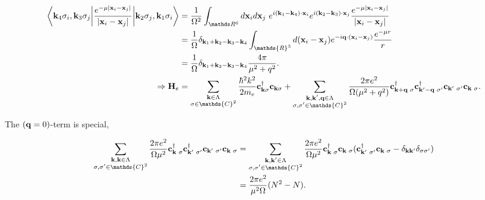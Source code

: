 \documentclass{homework}
\begin{document}
\begin{equation}
    \begin{split}
        \bigg\langle {{\bf k}_4 \sigma_i, {\bf k}_3 \sigma_j}\bigg| \frac{e^{-\mu |{\bf x}_i - {\bf x}_j|}}{|{\bf x}_i- {\bf x}_j|} \bigg|{{\bf k}_2 \sigma_j, {\bf k}_1 \sigma_i} \bigg\rangle &= \frac{1}{\Omega^2} \int_{\R^6} d{\bf x}_i d{\bf x}_j \blanky e^{i({\bf k}_1 - {\bf k}_4) \cdot {\bf x}_i} e^{i({\bf k}_2 - {\bf k}_3) \cdot {\bf x}_j} \frac{e^{-\mu |{\bf x}_i - {\bf x}_j|}}{|{\bf x}_i- {\bf x}_j|} \\
        &= \frac{1}{\Omega} \delta_{{\bf k}_1+{\bf k}_2 - {\bf k}_3 - {\bf k}_4} \int_{\mathds{R}^3} d({\bf x}_i - {\bf x}_j) e^{-i {\bf q} \cdot ({\bf x}_i-{\bf x}_j)} \frac{e^{-\mu r}}{r} \\
        &= \frac{1}{\Omega} \delta_{{\bf k}_1+{\bf k}_2 - {\bf k}_3 - {\bf k}_4} \frac{4\pi}{\mu^2 + q^2}. \\
    \Rightarrow {\bf H}_e &= \sum_{\substack{{\bf k} \in \Lambda\\
    \sigma \in \mathds{C}^2}} \frac{\hbar^2 k^2}{2m_e} {\bf c}_{{\bf k} \sigma}^\dagger {\bf c}_{{\bf k} \sigma} +  \sum_{\substack{{\bf k},{\bf k}',{\bf q} \in \Lambda\\
    \sigma, \sigma' \in \mathds{C}^2}} \frac{2\pi e^2}{\Omega(\mu^2 + q^2)} {\bf c}_{{\bf k}+{\bf q} \blanky \sigma}^\dagger {\bf c}_{{\bf k}'-{\bf q} \blanky \sigma'}^\dagger {\bf c}_{{\bf k}' \blanky \sigma'} {\bf c}_{{\bf k} \blanky \sigma}.
    \label{pre-HF-jellium H}
    \end{split} 
\end{equation}

The $({\bf q}=0)$-term is special, 

\begin{equation}
    \begin{split}
    \sum_{\substack{{\bf k},{\bf k} \in \Lambda\\
    \sigma, \sigma' \in \mathds{C}^2}} \frac{2\pi e^2}{\Omega\mu^2} {\bf c}_{{\bf k} \blanky \sigma}^\dagger {\bf c}_{{\bf k}' \blanky \sigma'}^\dagger {\bf c}_{{\bf k}' \blanky \sigma'} {\bf c}_{{\bf k} \blanky \sigma} &= \sum_{\substack{{\bf k},{\bf k}' \in \Lambda\\
    \sigma, \sigma' \in \mathds{C}^2}} \frac{2\pi e^2}{\Omega\mu^2} {\bf c}_{{\bf k} \blanky \sigma}^\dagger {\bf c}_{{\bf k} \blanky \sigma} ({\bf c}_{{\bf k}' \blanky \sigma'}^\dagger {\bf c}_{{\bf k} \blanky \sigma} - \delta_{{\bf k}{\bf k}'} \delta_{\sigma \sigma'}) \\
    &= \frac{2 \pi e^2}{\mu^2 \Omega} (N^2 - N).
    \end{split}
\end{equation}
\end{document}
